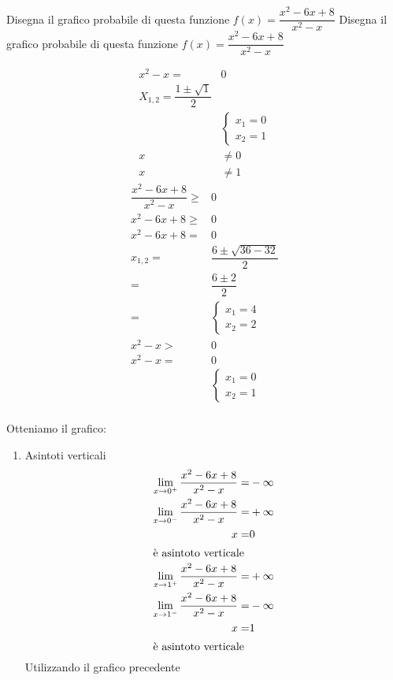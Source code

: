 \begin{exercise}
Disegna il grafico probabile di questa funzione $f(x)= \dfrac{x^2-6x+8}{x^2-x}$
	\tcblower
Disegna il grafico probabile di questa funzione $f(x)= \dfrac{x^2-6x+8}{x^2-x}$
	\begin{itemize}
	\begin{align*}
x^2-x=&0\\
X_{1,2}=\dfrac{1\pm\sqrt{1}}{2}\\
&\begin{cases}
x_1=0\\
x_2=1
\end{cases}\\
x&\neq 0\\
x&\neq 1
	\end{align*}
	\begin{align*}
	\dfrac{x^2-6x+8}{x^2-x}\geq&0\\
	x^2-6x+8\geq&0\\
	x^2-6x+8=&0\\
	x_{1,2}=&\dfrac{6\pm\sqrt{36-32}}{2}\\
	=&\dfrac{6\pm 2}{2}\\
	=&\begin{cases}
	x_1=4\\
	x_2=2
	\end{cases}\\
	x^2-x>&0\\
	x^2-x=&0\\
	&\begin{cases}
	x_1=0\\
	x_2=1
	\end{cases}\\
	\end{align*}
	
	Otteniamo il grafico:
	\begin{center}
		
	\end{center}
	\begin{enumerate}
		\item Asintoti verticali
		\begin{align*}
		\lim_{x\to 0^+}\dfrac{x^2-6x+8}{x^2-x}=&-\infty\\
		\lim_{x\to 0^-}\dfrac{x^2-6x+8}{x^2-x}=&+\infty\\
		x=&0\\
		\intertext{è asintoto verticale}
		\lim_{x\to 1^+}\dfrac{x^2-6x+8}{x^2-x}=&+\infty\\
		\lim_{x\to 1^-}\dfrac{x^2-6x+8}{x^2-x}=&-\infty\\
		x=&1\\
		\intertext{è asintoto verticale}
		\end{align*}
		Utilizzando il grafico precedente
		

\end{enumerate}
\end{itemize}
\end{exercise}

